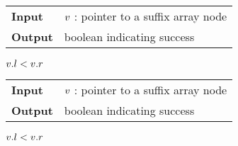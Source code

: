 \begin{figure*}[t!]
\begin{minipage}[t]{.5\textwidth}
\begin{algorithm}[H]
\begin{tabular}{ll}
\textbf{Input}  & $v$ : pointer to a suffix array node\\
\textbf{Output} & boolean indicating success\\
\end{tabular}
\begin{algorithmic}[1]
	\State \Return \False
\EndIf
{}
{}
\EndIf
\State \Return $v.l < v.r$
\end{algorithmic}
\label{alg:sa-godown}
\end{algorithm}
\end{minipage}
\hfill
\begin{minipage}[t]{.5\textwidth}
\begin{algorithm}[H]
\begin{tabular}{ll}
\textbf{Input}  & $v$ : pointer to a suffix array node\\
\textbf{Output} & boolean indicating success\\
\end{tabular}
\begin{algorithmic}[1]
	\State \Return \False
\EndIf
{}
\EndIf
\State \Return $v.l < v.r$
\item[]
\end{algorithmic}
\label{alg:sa-goright}
\end{algorithm}
\end{minipage}
\end{figure*}

